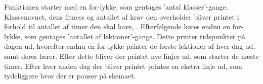 Funktionen starter med en for-lykke, som gentages ’antal klasser’-gange. Klassenavnet, dens fitness og antallet af krav den overholder bliver printet i forhold til antallet af timer den skal have, . 
Efterfølgende køres endnu en for-lykke, som gentages ’antallet af lektioner’-gange. Dette printer tidspunktet på dagen ud, hvorefter endnu en for-lykke printer de første lektioner af hver dag ud, samt deres lærer.
Efter dette bliver der printet nye linjer ud, som starter de næste timer. Efter hver anden dag der bliver printet printes en ekstra linje ud, som tydeliggøre hvor der er pauser på skemaet.

